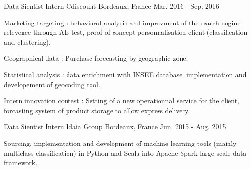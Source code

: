 \begin{cventries}
  \cventry
    {Data Sientist Intern} %
    {Cdiscount} %
    {Bordeaux, France} %
    {Mar. 2016 - Sep. 2016} %
    {
      \begin{cvitems} %
        \item {Marketing targeting : behavioral analysis and improvment of the search engine relevence through AB test, proof of concept personnalisation client (classification and clustering).}
        \item {Geographical data : Purchase forecasting by geographic zone.}
        \item {Statistical analysis : data enrichment with INSEE database, implementation and developement of geocoding tool.}
        \item {Intern innovation contest : Setting of a new operationnal service for the client, forcasting system of product storage to allow express delivery.}
      \end{cvitems}
    }

  \cventry
    {Data Sientist Intern} %
    {Idaia Group} %
    {Bordeaux, France} %
    {Jun. 2015 - Aug. 2015} %
    {
      \begin{cvitems} %
        \item {Sourcing, implementation and development of machine learning tools (mainly multiclass classification) in Python and Scala into Apache Spark large-scale data framework.}
      \end{cvitems}
    }
    
\end{cventries}
